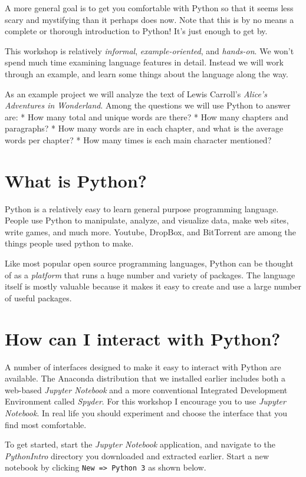 \documentclass[]{book}
\begin{document}
A more general goal is to get you comfortable with Python so that it
seems less scary and mystifying than it perhaps does now. Note that this
is by no means a complete or thorough introduction to Python! It's just
enough to get by.

This workshop is relatively \emph{informal}, \emph{example-oriented},
and \emph{hands-on}. We won't spend much time examining language
features in detail. Instead we will work through an example, and learn
some things about the language along the way.

As an example project we will analyze the text of Lewis Carroll's
\emph{Alice's Adventures in Wonderland}. Among the questions we will use
Python to answer are: * How many total and unique words are there? * How
many chapters and paragraphs? * How many words are in each chapter, and
what is the average words per chapter? * How many times is each main
character mentioned?

\section{What is Python?}\label{what-is-python}

Python is a relatively easy to learn general purpose programming
language. People use Python to manipulate, analyze, and visualize data,
make web sites, write games, and much more. Youtube, DropBox, and
BitTorrent are among the things people used python to make.

Like most popular open source programming languages, Python can be
thought of as a \emph{platform} that runs a huge number and variety of
packages. The language itself is mostly valuable because it makes it
easy to create and use a large number of useful packages.

\section{How can I interact with
Python?}\label{how-can-i-interact-with-python}

A number of interfaces designed to make it easy to interact with Python
are available. The Anaconda distribution that we installed earlier
includes both a web-based \emph{Jupyter Notebook} and a more
conventional Integrated Development Environment called \emph{Spyder}.
For this workshop I encourage you to use \emph{Jupyter Notebook}. In
real life you should experiment and choose the interface that you find
most comfortable.

To get started, start the \emph{Jupyter Notebook} application, and
navigate to the \emph{PythonIntro} directory you downloaded and
extracted earlier. Start a new notebook by clicking
\texttt{New\ =\textgreater{}\ Python\ 3} as shown below.
\end{document}
